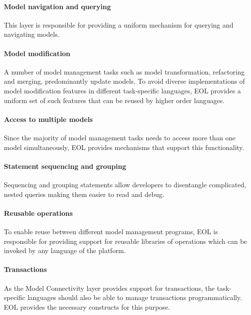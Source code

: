 \paragraph{Model navigation and querying} This layer is responsible for providing a uniform mechanism for querying and navigating models.

\paragraph{Model modification} A number of model management tasks such as model transformation, refactoring and merging, predominantly update models. To avoid diverse implementations of model modification features in different task-specific languages, EOL provides a uniform set of such features that can be reused by higher order languages.

\paragraph{Access to multiple models} Since the majority of model management tasks needs to access more than one model simultaneously, EOL provides mechanisms that support this functionality.

\paragraph{Statement sequencing and grouping} Sequencing and grouping statements allow developers to disentangle complicated, nested queries making them easier to read and debug.

\paragraph{Reusable operations} To enable reuse between different model management programs, EOL is responsible for providing support for reusable libraries of operations which can be invoked by any language of the platform.

\paragraph{Transactions} As the Model Connectivity layer provides support for transactions, the task-specific languages should also be able to manage transactions programmatically. EOL provides the necessary constructs for this purpose.

